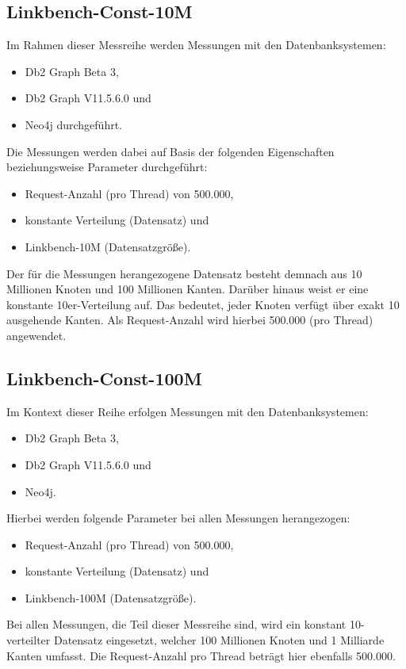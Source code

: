 \subsection{Linkbench-Const-10M}
Im Rahmen dieser Messreihe werden Messungen mit den Datenbanksystemen:
\begin{itemize}
    \item Db2 Graph Beta 3,
    \item Db2 Graph V11.5.6.0 und 
    \item Neo4j durchgeführt. 
\end{itemize}
Die Messungen werden dabei auf Basis der folgenden Eigenschaften beziehungsweise Parameter durchgeführt:
\begin{itemize}
    \item Request-Anzahl (pro Thread) von 500.000, 
    \item konstante Verteilung (Datensatz) und
    \item Linkbench-10M (Datensatzgröße).
\end{itemize}
Der für die Messungen herangezogene Datensatz besteht demnach aus 10 Millionen Knoten und 100 Millionen Kanten. Darüber hinaus weist er eine konstante 10er-Verteilung auf. Das bedeutet, jeder Knoten verfügt über exakt 10 ausgehende Kanten. Als Request-Anzahl wird hierbei 500.000 (pro Thread) angewendet.

\subsection{Linkbench-Const-100M}
Im Kontext dieser Reihe erfolgen Messungen mit den Datenbanksystemen:
\begin{itemize}
    \item Db2 Graph Beta 3,
    \item Db2 Graph V11.5.6.0 und 
    \item Neo4j. 
\end{itemize}

Hierbei werden folgende Parameter bei allen Messungen herangezogen:
\begin{itemize}
    \item Request-Anzahl (pro Thread) von 500.000, 
    \item konstante Verteilung (Datensatz) und
    \item Linkbench-100M (Datensatzgröße).
\end{itemize}
Bei allen Messungen, die Teil dieser Messreihe sind, wird ein konstant 10-verteilter Datensatz eingesetzt, welcher 100 Millionen Knoten und 1 Milliarde Kanten umfasst. Die Request-Anzahl pro Thread beträgt hier ebenfalls 500.000.

